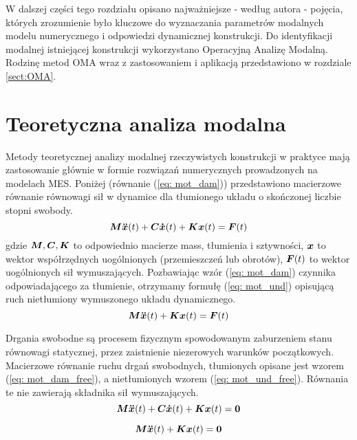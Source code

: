 W dalszej części tego rozdziału opisano najważniejsze - według autora - pojęcia, których zrozumienie było kluczowe do wyznaczania parametrów modalnych modelu numerycznego i odpowiedzi dynamicznej konstrukcji. Do identyfikacji modalnej istniejącej konstrukcji wykorzystano Operacyjną Analizę Modalną. Rodzinę metod OMA wraz z zastosowaniem i aplikacją przedstawiono w rozdziale \ref{sect:OMA}.

\section{Teoretyczna analiza modalna}
\label{section: eigen}
Metody teoretycznej analizy modalnej rzeczywistych konstrukcji w praktyce mają zastosowanie głównie w formie rozwiązań numerycznych prowadzonych na modelach MES. Poniżej (równanie (\ref{eq: mot_dam})) przedstawiono macierzowe równanie równowagi sił w dynamice dla tłumionego układu o skończonej liczbie stopni swobody.
\begin{equation} \label{eq: mot_dam}
\bm{M} \bm{\ddot{x}}(t) +\bm{C} \bm{\dot{x}}(t)+ \bm{Kx}(t) = \bm{F}(t)
\end{equation}
gdzie $\bm{M},\bm{C},\bm{K}$ to odpowiednio macierze mass, tłumienia i sztywności, $\bm{x}$ to wektor współrzędnych uogólnionych (przemieszczeń lub obrotów), $\bm{F}(t)$ to wektor uogólnionych sił wymuszających. Pozbawiając wzór (\ref{eq: mot_dam}) czynnika odpowiadającego za tłumienie, otrzymamy formułę (\ref{eq: mot_und}) opisującą ruch nietłumiony wymuszonego układu dynamicznego. 
\begin{equation} \label{eq: mot_und}
\bm{M} \bm{\ddot{x}}(t) +\bm{Kx}(t) = \bm{F}(t)
\end{equation}

Drgania swobodne są procesem fizycznym spowodowanym zaburzeniem stanu równowagi statycznej, przez zaistnienie niezerowych warunków początkowych. Macierzowe równanie ruchu drgań swobodnych, tłumionych opisane jest wzorem (\ref{eq: mot_dam_free}), a nietłumionych wzorem (\ref{eq: mot_und_free}). Równania te nie zawierają składnika sił wymuszających.
\begin{equation} \label{eq: mot_dam_free}
\bm{M} \bm{\ddot{x}}(t) +\bm{C} \bm{\dot{x}}(t)+ \bm{Kx}(t) = \bm{0}
\end{equation}

\begin{equation} \label{eq: mot_und_free}
\bm{M} \bm{\ddot{x}}(t) +\bm{Kx}(t) = \bm{0}
\end{equation}

